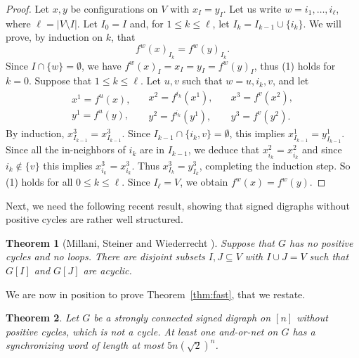 \documentclass[11pt,letter]{article}
\newtheorem{theorem}{Theorem}
\begin{document}
\begin{proof}
Let $x,y$ be configurations on $V$ with $x_I=y_I$. Let us write $w=i_1,\dots,i_\ell$, where $\ell=|V\setminus I|$. Let $I_0=I$ and, for $1\leq k\leq \ell$, let $I_k=I_{k-1}\cup\{i_k\}$. We will prove, by induction on $k$, that 
\[\tag{1}
f^w(x)_{I_k}=f^w(y)_{I_k}.
\]
Since $I\cap\{w\}=\emptyset$, we have $f^w(x)_I=x_I=y_I=f^w(y)_I$, thus (1) holds for $k=0$. Suppose that $1\leq k\leq \ell$. Let $u,v$ such that $w=u,i_k,v$, and let 
\[
\begin{array}{l}
x^1=f^u(x),\\
y^1=f^u(y),
\end{array}
\quad
\begin{array}{l}
x^2=f^{i_k}(x^1),\\
y^2=f^{i_k}(y^1),
\end{array}
\quad
\begin{array}{l}
x^3=f^v(x^2),\\
y^3=f^v(y^2).
\end{array}
\]
By induction, $x^3_{I_{k-1}}=x^3_{I_{k-1}}$. Since $I_{k-1}\cap \{i_k,v\}=\emptyset$, this implies $x^1_{I_{k-1}}=y^1_{I_{k-1}}$. Since all the in-neighbors of $i_k$ are in $I_{k-1}$, we deduce that $x^2_{i_k}=x^2_{i_k}$ and since $i_k\not\in\{v\}$ this implies $x^3_{i_k}=x^3_{i_k}$. Thus $x^3_{I_k}=y^3_{I_k}$, completing the induction step. So (1) holds for all $0\leq k\leq\ell$. Since $I_\ell=V$, we obtain $f^w(x)=f^w(y)$. 
\end{proof}

Next, we need the following recent result, showing that signed digraphs without positive cycles are rather well structured. 

\begin{theorem}[Millani, Steiner and Wiederrecht \cite{MSW19}]\label{thm:chromatic}
Suppose that $G$ has no positive cycles and no loops. There are disjoint subsets $I,J\subseteq V$ with $I\cup J=V$ such that $G[I]$ and $G[J]$ are acyclic.  
\end{theorem}

We are now in position to prove Theorem~\ref{thm:fast}, that we restate.

\setcounter{theorem}{1}
\begin{theorem}
Let $G$ be a strongly connected signed digraph on $[n]$ without positive cycles, which is not a cycle. At least one and-or-net on $G$ has a synchronizing word of length at most $5n(\sqrt{2})^n$. \end{theorem}
\setcounter{theorem}{5}
\end{document}
